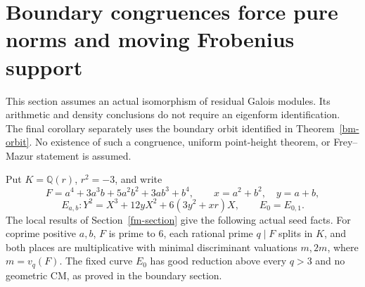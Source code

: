 \section{Boundary congruences force pure norms and moving Frobenius support}
\label{bc-section}

This section assumes an actual isomorphism of residual Galois modules.
Its arithmetic and density conclusions do not require an eigenform
identification. The final corollary separately uses the boundary orbit
identified in Theorem~\ref{bm-orbit}. No existence of such a congruence,
uniform point-height theorem, or Frey--Mazur statement is assumed.

Put $K=\mathbb Q(r)$, $r^2=-3$, and write
\[
 F=a^4+3a^3b+5a^2b^2+3ab^3+b^4,\qquad
 x=a^2+b^2,\quad y=a+b,
\]
\[
 E_{a,b}:Y^2=X^3+12yX^2+6(3y^2+xr)X,
 \qquad E_0=E_{0,1}.
\]
The local results of Section~\ref{fm-section} give the following actual
seed facts. For coprime positive $a,b$, $F$ is prime to $6$, each
rational prime $q\mid F$ splits in $K$, and both places are
multiplicative with minimal discriminant valuations $m,2m$, where
$m=v_q(F)$. The fixed curve $E_0$ has good reduction above every
$q>3$ and no geometric CM, as proved in the boundary section.

